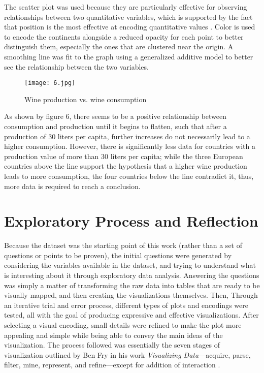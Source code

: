 The scatter plot was used because they are particularly effective for observing relationships between two quantitative variables, which is supported by the fact that position is the most effective at encoding quantitative values \cite{Mackinlay}. Color is used to encode the continents alongside a reduced opacity for each point to better distinguish them, especially the ones that are clustered near the origin. A smoothing line was fit to the graph using a generalized additive model to better see the relationship between the two variables.

\begin{figure}[h]
  \texttt{[image: 6.jpg]}
  \caption{Wine production vs. wine consumption}
\end{figure}

As shown by figure 6, there seems to be a positive relationship between consumption and production until it begins to flatten, such that after a production of 30 liters per capita, further increases do not necessarily lead to a higher consumption. However, there is significantly less data for countries with a production value of more than 30 liters per capita; while the three European countries above the line support the hypothesis that a higher wine production leads to more consumption, the four countries below the line contradict it, thus, more data is required to reach a conclusion.


\section{Exploratory Process and Reflection}

Because the dataset was the starting point of this work (rather than a set of questions or points to be proven), the initial questions were generated by considering the variables available in the dataset, and trying to understand what is interesting about it through exploratory data analysis. Answering the questions was simply a matter of transforming the raw data into tables that are ready to be visually mapped, and then creating the visualizations themselves. Then, Through an iterative trial and error process, different types of plots and encodings were tested, all with the goal of producing expressive and effective visualizations. After selecting a visual encoding, small details were refined to make the plot more appealing and simple while being able to convey the main ideas of the visualization. The process followed was essentially the seven stages of visualization outlined by Ben Fry in his work \emph{Visualizing Data}---acquire, parse, filter, mine, represent, and refine---except for addition of interaction \cite{Fry}.

